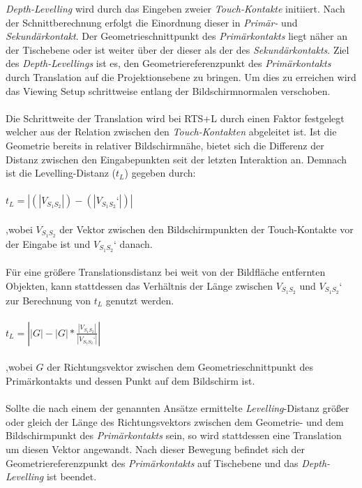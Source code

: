 \emph{Depth-Levelling} wird durch das Eingeben zweier \emph{Touch-Kontakte} initiiert. Nach der Schnittberechnung erfolgt die Einordnung dieser in \emph{Primär-} und \linebreak \emph{Sekundärkontakt}. Der Geometrieschnittpunkt des \emph{Primärkontakts} liegt näher an der Tischebene oder ist weiter über der dieser als der des \emph{Sekundärkontakts}. Ziel des \emph{Depth-Levellings} ist es, den Geometriereferenzpunkt des \emph{Primärkontakts} durch Translation auf die Projektionsebene zu bringen. Um dies zu erreichen wird das Viewing Setup schrittweise entlang der Bildschirmnormalen verschoben. 
\\\\
Die Schrittweite der Translation wird bei RTS+L durch einen Faktor festgelegt welcher aus der Relation zwischen den \emph{Touch-Kontakten} abgeleitet ist. Ist die Geometrie bereits in relativer Bildschirmnähe, bietet sich die Differenz der Distanz zwischen den Eingabepunkten  seit der letzten Interaktion an. Demnach ist die Levelling-Distanz ($t_L$) gegeben durch:
\\\\
$t_L = | (|V_{S_1S_2}|) - (|V_{S_1S_2}‘|) |$ 
\\\\
,wobei $V_{S_1S_2}$ der Vektor zwischen den Bildschirmpunkten der Touch-Kontakte vor der Eingabe ist und $V_{S_1S_2}‘$ danach. 
\\\\
Für eine größere Translationsdistanz bei weit von der Bildfläche entfernten Objekten, kann stattdessen das Verhältnis der Länge zwischen $V_{S_1S_2}$ und $V_{S_1S_2}‘$ zur Berechnung von $t_L$ genutzt werden.
\\\\
$t_L = \left||G| - |G| * \frac{|V_{S_1S_2}|}{|V_{S_1S_2}‘|}\right|$
\\\\
,wobei $G$ der Richtungsvektor zwischen dem Geometrieschnittpunkt des \linebreak Primärkontakts und dessen Punkt auf dem Bildschirm ist.
\\\\
Sollte die nach einem der genannten Ansätze ermittelte \emph{Levelling}-Distanz größer oder gleich der Länge des Richtungsvektors zwischen dem Geometrie- und dem Bildschirmpunkt des \emph{Primärkontakts} sein, so wird stattdessen eine Translation um diesen Vektor angewandt. Nach dieser Bewegung befindet sich der Geometriereferenzpunkt des \emph{Primärkontakts} auf Tischebene und das \emph{Depth-Levelling} ist beendet.

